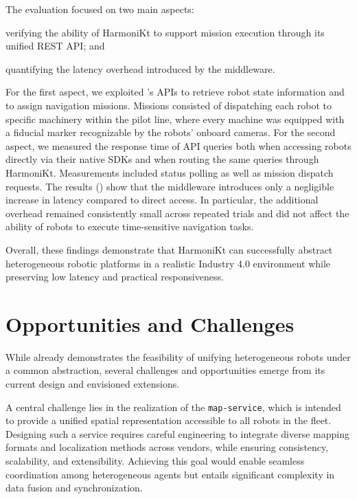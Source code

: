 \documentclass[conference]{IEEEtran}
\begin{document}
The evaluation focused on two main aspects: 
\begin{enumerate*}[label=(\roman*)]
    \item verifying the ability of HarmoniKt to support mission execution through its unified REST API; and 
    \item quantifying the latency overhead introduced by the middleware. 
\end{enumerate*}
% 
For the first aspect, 
 we exploited \approach{}'s APIs to retrieve robot state information and to assign navigation missions. 
% 
Missions consisted of dispatching each robot to specific machinery within the pilot line, 
 where every machine was equipped with a fiducial marker recognizable by the robots' onboard cameras. 
%
For the second aspect, 
 we measured the response time of API queries both when accessing robots directly via their native SDKs 
 and when routing the same queries through HarmoniKt. 
%  
Measurements included status polling as well as mission dispatch requests. 
%
The results () show that the middleware introduces only a negligible increase in latency compared to direct access. 
%
In particular, 
 the additional overhead remained consistently small across repeated trials 
 and did not affect the ability of robots to execute time-sensitive navigation tasks.

Overall, 
 these findings demonstrate that HarmoniKt can successfully abstract heterogeneous robotic platforms 
 in a realistic Industry 4.0 environment while preserving low latency and practical responsiveness. 

\section{Opportunities and Challenges}\label{sec:impact}

While \approach{} already demonstrates the feasibility of unifying 
 heterogeneous robots under a common abstraction, 
 several challenges and opportunities emerge from its current design and envisioned extensions.

A central challenge lies in the realization of the \texttt{map-service}, 
 which is intended to provide a unified spatial representation accessible to all robots in the fleet. 
% 
Designing such a service requires careful engineering to integrate diverse mapping formats 
 and localization methods across vendors, while ensuring consistency, scalability, and extensibility. 
% 
Achieving this goal would enable seamless coordination among heterogeneous agents 
 but entails significant complexity in data fusion and synchronization.
\end{document}
